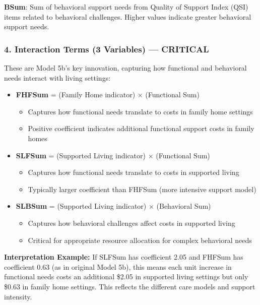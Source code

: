\textbf{BSum}: Sum of behavioral support needs from Quality of Support Index (QSI) items related to behavioral challenges. Higher values indicate greater behavioral support needs.

\subsubsection{4. Interaction Terms (3 Variables) --- CRITICAL}

These are Model 5b's key innovation, capturing how functional and behavioral needs interact with living settings:

\begin{itemize}
    \item \textbf{FHFSum} = (Family Home indicator) $\times$ (Functional Sum)
        \begin{itemize}
            \item Captures how functional needs translate to costs in family home settings
            \item Positive coefficient indicates additional functional support costs in family homes
        \end{itemize}
    
    \item \textbf{SLFSum} = (Supported Living indicator) $\times$ (Functional Sum)
        \begin{itemize}
            \item Captures how functional needs translate to costs in supported living
            \item Typically larger coefficient than FHFSum (more intensive support model)
        \end{itemize}
    
    \item \textbf{SLBSum} = (Supported Living indicator) $\times$ (Behavioral Sum)
        \begin{itemize}
            \item Captures how behavioral challenges affect costs in supported living
            \item Critical for appropriate resource allocation for complex behavioral needs
        \end{itemize}
\end{itemize}

\textbf{Interpretation Example:} If SLFSum has coefficient 2.05 and FHFSum has coefficient 0.63 (as in original Model 5b), this means each unit increase in functional needs costs an additional \$2.05 in supported living settings but only \$0.63 in family home settings. This reflects the different care models and support intensity.

